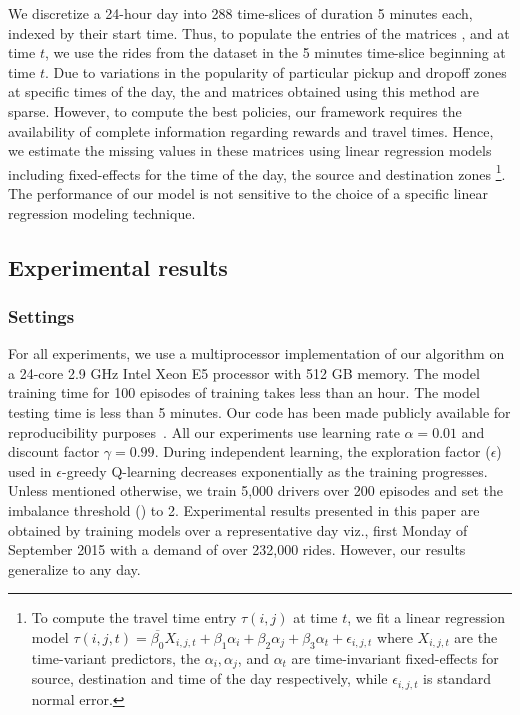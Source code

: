We discretize a 24-hour day into 288 time-slices of
    duration 5 minutes each, indexed by their start time. 
Thus, to populate the entries of the matrices {\demandmatrix}, {\rewardmatrix}
    and {\traveltimematrix} at time $t$, we use the rides from the dataset in the 5
    minutes time-slice beginning at time $t$. 
Due to variations in the popularity of particular pickup and dropoff
    zones at specific times of the day, the {\rewardmatrix} and
    {\traveltimematrix} matrices obtained using this
    method are sparse. 
However, to compute the best policies, our framework requires 
    the availability of complete information regarding rewards and travel times.
Hence, we estimate the missing values in these matrices using linear regression
    models including fixed-effects for the time of the day, the source and
    destination zones
\footnote{To compute the travel time entry
    $\tau(i,j)$ at time $t$, we fit a linear regression model $\tau(i,j,
    t) = \overline{\beta_0} X_{i,j,t} + \beta_1 \alpha_i + \beta_2 \alpha_j + \beta_3 \alpha_t + \epsilon_{i, j, t}$ where
    $X_{i,j,t}$ are the time-variant predictors, the $\alpha_i,
    \alpha_j$, and
    $\alpha_t$ are time-invariant fixed-effects for source, destination and
    time of the day respectively, while $\epsilon_{i,j,t}$ is standard normal error.}. 
The performance of our model is not sensitive to the
    choice of a specific linear regression modeling technique.

\subsection{Experimental results}

\subsubsection{Settings} For all experiments, we use a multiprocessor 
    implementation of our algorithm
    on a 24-core 2.9 GHz Intel Xeon E5 processor with 512 GB memory. 
The model training time for 100 episodes of training takes less than an hour. The
model testing time is less than 5 minutes. 
Our code has been made publicly available for reproducibility
purposes~\cite{github-page}.
All our experiments use learning rate $\alpha= 0.01$ and 
    discount factor $\gamma= 0.99$.
During independent learning, the exploration factor ($\epsilon$) used 
    in $\epsilon$-greedy Q-learning decreases exponentially as the 
    training progresses.
Unless mentioned otherwise, we train 5,000 drivers over 200 episodes 
    and set the imbalance threshold ({\imbalancethreshold}) to 2. 
Experimental results presented in this paper are obtained by training models 
    over a representative day viz., first Monday of September 2015 
    with a demand of over 232,000 rides.
However, our results generalize to any day. 

